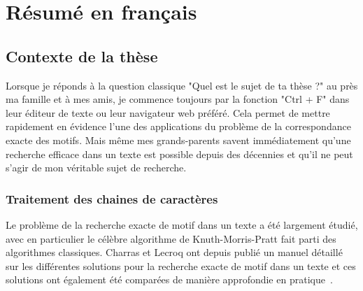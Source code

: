 \chapter*{Résumé en français}\setcounter{page}{1}



\newpage

\section*{Contexte de la thèse}

Lorsque je réponds à la question classique "Quel est le sujet de ta thèse ?" au près ma famille et à mes amis, je commence toujours par la fonction "Ctrl + F" dans leur éditeur de texte ou leur navigateur web préféré. Cela permet de mettre rapidement en évidence l'une des applications du problème de la correspondance exacte des motifs.
Mais même mes grands-parents savent immédiatement qu'une recherche efficace dans un texte est possible depuis des décennies et qu'il ne peut s'agir de mon véritable sujet de recherche.

\subsection*{Traitement des chaines de caractères}

Le problème de la recherche exacte de motif dans un texte a été largement étudié, avec en particulier le célèbre algorithme de Knuth-Morris-Pratt fait parti des algorithmes classiques. Charras et Lecroq ont depuis publié un manuel détaillé~\cite{Charras2004} sur les différentes solutions pour la recherche exacte de motif dans un texte et ces solutions ont également été comparées de manière approfondie en pratique~\cite{DBLP:journals/corr/abs-1012-2547, faro2013exact}.


